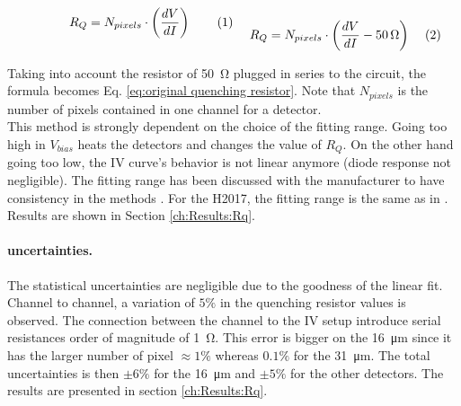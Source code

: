 \begin{equation*}
  \begin{minipage}[t]{0.48\linewidth}
        \begin{equation}
            R_Q = N_{pixels}\cdot \left(\frac{dV}{dI}\right)
        \label{eq:original quenching resistor1}
        \end{equation}
  \end{minipage}
  \hfill
  \begin{minipage}[t]{0.48\linewidth}
        \begin{equation}
            R_Q = N_{pixels}\cdot \left(\frac{dV}{dI} - \SI{50}{\ohm} \right)
        \label{eq:original quenching resistor}
        \end{equation}
  \end{minipage}  
\end{equation*}

Taking into account the resistor of \SI{50}{\ohm} plugged in series to the circuit, the formula becomes Eq. \eqref{eq:original quenching resistor}.
Note that $N_{pixels}$ is the number of pixels contained in one channel for a detector. 
\\
This method is strongly dependent on the choice of the fitting range. Going too high in $V_{bias}$ heats the detectors and changes the value of $R_Q$. On the other hand going too low, the IV curve's behavior is not linear anymore (diode response not negligible). The fitting range has been discussed with the manufacturer to have consistency in the methods \cite{StefanoMerzi2023PrivateCommunication}. For the H2017, the fitting range is the same as in \cite{Girard2018CharacterisationDistributions}. Results are shown in Section \ref{ch:Results:Rq}.

\paragraph{uncertainties.} The statistical uncertainties are negligible due to the goodness of the linear fit. 
Channel to channel, a variation of $5\%$ in the quenching resistor values is observed. The connection between the channel to the IV setup introduce serial resistances order of magnitude of \SI{1}{\ohm}. This error is bigger on the \SI{16}{\micro m} since it has the larger number of pixel $\approx 1\%$ whereas $0.1\%$ for the \SI{31}{\micro m}. The total uncertainties is then $\pm 6\%$ for the \SI{16}{\micro m} and $\pm 5\%$ for the other detectors. 
The results are presented in section \ref{ch:Results:Rq}.


